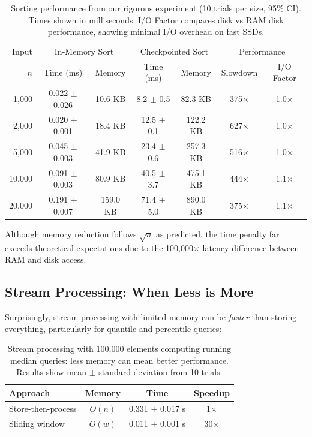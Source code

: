 \documentclass[11pt]{article}
\theoremstyle{definition}
\begin{document}
\begin{table}[ht]
\centering
\begin{tabular}{rcccccc}
\toprule
Input & \multicolumn{2}{c}{In-Memory Sort} & \multicolumn{2}{c}{Checkpointed Sort} & \multicolumn{2}{c}{Performance} \\
\cmidrule(lr){2-3} \cmidrule(lr){4-5} \cmidrule(lr){6-7}
$n$ & Time (ms) & Memory & Time (ms) & Memory & Slowdown & I/O Factor \\
\midrule
1,000 & 0.022 $\pm$ 0.026 & 10.6 KB & 8.2 $\pm$ 0.5 & 82.3 KB & 375× & 1.0× \\
2,000 & 0.020 $\pm$ 0.001 & 18.4 KB & 12.5 $\pm$ 0.1 & 122.2 KB & 627× & 1.0× \\
5,000 & 0.045 $\pm$ 0.003 & 41.9 KB & 23.4 $\pm$ 0.6 & 257.3 KB & 516× & 1.0× \\
10,000 & 0.091 $\pm$ 0.003 & 80.9 KB & 40.5 $\pm$ 3.7 & 475.1 KB & 444× & 1.1× \\
20,000 & 0.191 $\pm$ 0.007 & 159.0 KB & 71.4 $\pm$ 5.0 & 890.0 KB & 375× & 1.1× \\
\bottomrule
\end{tabular}
\caption{Sorting performance from our rigorous experiment (10 trials per size, 95\% CI). Times shown in milliseconds. I/O Factor compares disk vs RAM disk performance, showing minimal I/O overhead on fast SSDs.}
\label{tab:sorting-scaling}
\end{table}

Although memory reduction follows $\sqrt{n}$ as predicted, the time penalty far exceeds theoretical expectations due to the 100,000$\times$ latency difference between RAM and disk access.

\subsection{Stream Processing: When Less is More}

Surprisingly, stream processing with limited memory can be \emph{faster} than storing everything, particularly for quantile and percentile queries:

\begin{table}[ht]
\centering
\begin{tabular}{lccc}
\toprule
Approach & Memory & Time & Speedup \\
\midrule
Store-then-process & $O(n)$ & 0.331 $\pm$ 0.017 s & 1$\times$ \\
Sliding window & $O(w)$ & 0.011 $\pm$ 0.001 s & 30$\times$ \\
\bottomrule
\end{tabular}
\caption{Stream processing with 100,000 elements computing running median queries: less memory can mean better performance. Results show mean $\pm$ standard deviation from 10 trials.}
\label{tab:streaming}
\end{table}
\end{document}
